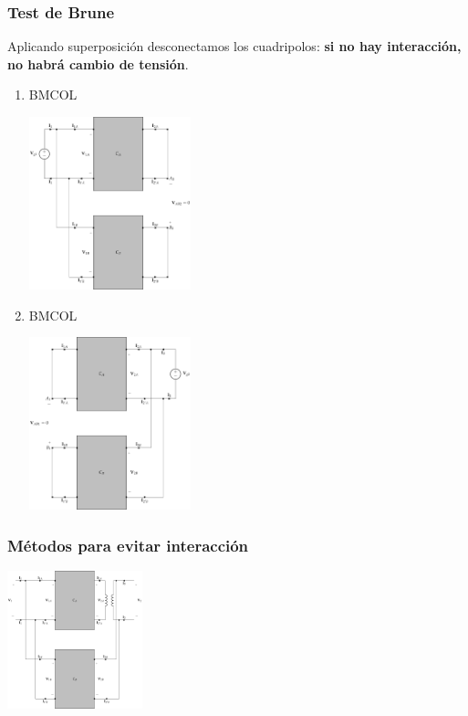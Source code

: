 \subsubsection{Test de Brune}
\label{sec:org199da56}
Aplicando superposición desconectamos los cuadripolos: \textbf{si no hay interacción, no habrá cambio de tensión}.
\begin{enumerate}
\item \hfill{}\textsc{BMCOL}
\label{sec:orge3bd0e3}

\includegraphics[height=5cm]{../figs/paralelo-paralelo-brune-entrada2.pdf}

\item \hfill{}\textsc{BMCOL}
\label{sec:org745f22c}

\includegraphics[height=5cm]{../figs/paralelo-paralelo-brune-salida2.pdf}

\end{enumerate}

\subsubsection{Métodos para evitar interacción}
\label{sec:org31cbc7e}

\includegraphics[height=4cm]{../figs/paralelo-paralelo-transformador.pdf}

